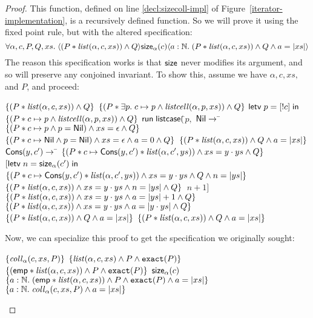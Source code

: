 \begin{proof}
This function, defined on line \ref{decl:sizecoll-impl} of Figure~\ref{iterator-implementation},
is a recursively defined function. So we will prove it using the fixed point rule, but with the
altered specification:
\begin{displaymath}
\forall \alpha, c, P, Q, xs.\; \langle{(P * \mathit{list}(\alpha, c, xs)) \land Q}\rangle{\mathsf{size}_\alpha(c)}\langle{a:\mathbb{N}}.\;{(P * \mathit{list}(\alpha, c, xs)) \land Q \land a = |xs|}\rangle
\end{displaymath}
The reason this specification works is that $\mathsf{size}$ never modifies
its argument, and so will preserve any conjoined invariant. 
To show this, assume we have $\alpha, c, xs,$ and $P$, and proceed:
\begin{specification}
\nextline $\{{(P * \mathit{list}(\alpha, c, xs)) \land Q}\}$ 
\nextline $\{{(P * \exists p.\; c \mapsto p \land \mathit{listcell}(\alpha, p, xs)) \land Q}\}$ 
\nextline $\mathsf{letv}\;p = [!c]\;\mathsf{in}\;$
\nextline $\{{(P * c \mapsto p \land \mathit{listcell}(\alpha, p, xs)) \land Q}\}$ 
\nextline $\mathsf{run}\;\mathsf{listcase}($\=$p,$ 
\nextline \> $\mathsf{Nil} \to $
\nextline \> \qquad \=$\{{(P * c \mapsto p \land p = \mathsf{Nil}) \land xs = \epsilon \land Q}\}$ 
\nextline \> \> 
\nextline \> \> $\{{(P * c \mapsto \mathsf{Nil} \land p = \mathsf{Nil}) \land xs = \epsilon \land a = 0 \land Q}\}$ 
\nextline \> \> $\{{(P * \mathit{list}(\alpha, c, xs)) \land Q \land a = |xs|}\}$ 
\nextline \> $\mathsf{Cons}(y, c') \to $ 
\nextline \> \qquad \= $\{{(P * c \mapsto \mathsf{Cons}(y, c') * \mathit{list}(\alpha, c', ys)) \land xs = y\cdot ys \land Q}\}$ 
\nextline \> \> $[\mathsf{letv}\;n = \mathsf{size}_\alpha(c')\;\mathsf{in}\;$
\nextline \> \> \,$\{{(P * c \mapsto \mathsf{Cons}(y, c') * \mathit{list}(\alpha, c', ys)) \land xs = y\cdot ys \land Q \land n = |ys|}\}$ 
\nextline \> \> \,$\{{(P * \mathit{list}(\alpha, c, xs)) \land xs = y\cdot ys \land n = |ys| \land Q}\}$ 
\nextline \> \> \,$n+1]$
\nextline \> \> $\{{(P * \mathit{list}(\alpha, c, xs)) \land xs = y\cdot ys \land a = |ys| + 1 \land Q}\}$ 
\nextline \> \> $\{{(P * \mathit{list}(\alpha, c, xs)) \land xs = y\cdot ys \land a = |y\cdot ys| \land Q}\}$ 
\nextline \> \> $\{{(P * \mathit{list}(\alpha, c, xs)) \land Q \land a = |xs|}\}$ 
\nextline $\{{(P * \mathit{list}(\alpha, c, xs)) \land Q \land a = |xs|}\}$ \\
\end{specification}

\noindent Now, we can specialize this proof to get the specification we originally sought:
\begin{specification}
\nextline $\{{\mathit{coll}_\alpha(c, xs, P)}\}$ 
\nextline $\{{\mathit{list}(\alpha, c, xs) \land P \land \mathtt{exact}({P})}\}$
\nextline $\{{(\mathsf{emp} * \mathit{list}(\alpha, c, xs)) \land P \land \mathtt{exact}({P})}\}$
\nextline $\mathsf{size}_\alpha(c)$ 
\nextline $\{{a:\mathbb{N}.\; (\mathsf{emp} * \mathit{list}(\alpha, c, xs)) \land P \land \mathtt{exact}({P}) \land a = |xs|}\}$
\nextline $\{{a:\mathbb{N}.\; \mathit{coll}_\alpha(c, xs, P) \land a = |xs|}\}$
\end{specification}
\end{proof}


